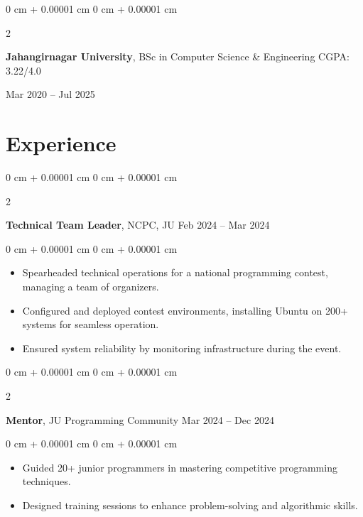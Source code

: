 \documentclass[10pt, letterpaper]{article}
\newenvironment{highlights}{
	\begin{itemize}[
		topsep=0.10 cm,
		parsep=0.10 cm,
		partopsep=0pt,
		itemsep=0pt,
		leftmargin=0 cm + 10pt
		]
	}{
	\end{itemize}
} %
\newenvironment{onecolentry}{
	\begin{adjustwidth}{
			0 cm + 0.00001 cm
		}{
			0 cm + 0.00001 cm
		}
	}{
	\end{adjustwidth}
} %
\newenvironment{twocolentry}[2][]{
	\onecolentry
	\def\secondColumn{#2}
	\setcolumnwidth{\fill, 4.5 cm}
	\begin{paracol}{2}
	}{
		\switchcolumn \raggedleft \secondColumn
	\end{paracol}
	\endonecolentry
} %
\begin{document}
	\vspace{0.2 cm}
	
	\begin{twocolentry}{
			Mar 2020 – Jul 2025
		}
		\textbf{Jahangirnagar University}, BSc in Computer Science \& Engineering \hfill CGPA: 3.22/4.0
	\end{twocolentry}
	
	
	
	
	\section{Experience}
	
	
	
	
	\begin{twocolentry}{
			Feb 2024 – Mar 2024
		}
		\textbf{Technical Team Leader}, NCPC, JU \end{twocolentry}
	
	\vspace{0.10 cm}
	\begin{onecolentry}
		\begin{highlights}
			\item Spearheaded technical operations for a national programming contest, managing a team of organizers.
			\item Configured and deployed contest environments, installing Ubuntu on 200+ systems for seamless operation.
			\item Ensured system reliability by monitoring infrastructure during the event.
		\end{highlights}
	\end{onecolentry}
	
	
	\vspace{0.2 cm}
	
	\begin{twocolentry}{
			Mar 2024 – Dec 2024
		}
		\textbf{Mentor}, JU Programming Community\end{twocolentry}
	
	\vspace{0.10 cm}
	\begin{onecolentry}
		\begin{highlights}
			\item Guided 20+ junior programmers in mastering competitive programming techniques.
			\item Designed training sessions to enhance problem-solving and algorithmic skills.
			
		\end{highlights}
	\end{onecolentry}
	
\end{document}
